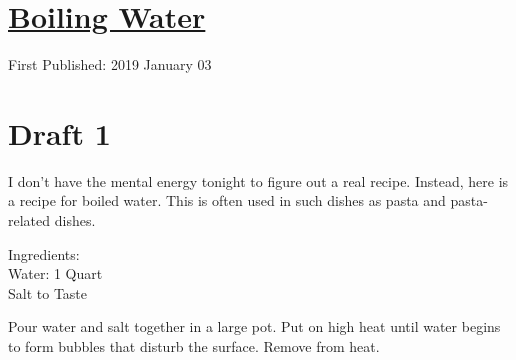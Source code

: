 \documentclass[12pt]{article}[titlepage]
\newcommand{\1}{\={a}}
\newcommand{\2}{\={e}}
\newcommand{\3}{\={\i}}
\newcommand{\4}{\=o}
\newcommand{\5}{\=u}
\newcommand{\6}{\={A}}
\renewcommand{\,}{\textsuperscript{,}}
\begin{document}
\doublespacing
\section{\href{boiling-water.html}{Boiling Water}}
First Published: 2019 January 03
\section{Draft 1}
I don't have the mental energy tonight to figure out a real recipe.
Instead, here is a recipe for boiled water.
This is often used in such dishes as pasta and pasta-related dishes.

Ingredients:\\
Water: 1 Quart\\
Salt to Taste

Pour water and salt together in a large pot.
Put on high heat until water begins to form bubbles that disturb the surface.
Remove from heat.
\end{document}
